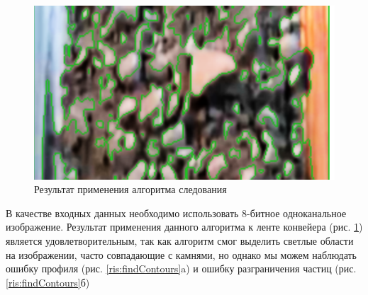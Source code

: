 \documentclass[specification,annotation,times]{itmo-student-thesis}
\begin{document}
\begin{figure}[h]
	\centering
	\includegraphics[width=0.7\linewidth]{images/findContour}
	\caption{Результат применения алгоритма следования }
	\label{fig:findcontour}
\end{figure}


В качестве входных данных необходимо использовать 8-битное одноканальное изображение.
Результат применения данного алгоритма к ленте конвейера (рис. \ref{fig:findcontour}) является удовлетворительным, так как алгоритм смог выделить светлые области на изображении, часто совпадающие с камнями, но однако мы можем наблюдать ошибку профиля (рис. \ref{ris:findContours}a) и ошибку разграничения частиц (рис. \ref{ris:findContours}б)
\end{document}
